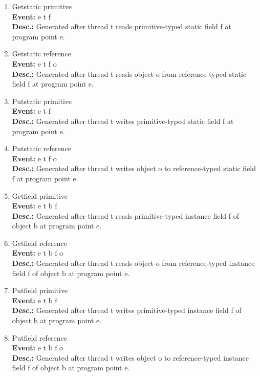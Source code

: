 \begin{enumerate}
\item
Getstatic primitive \\
{\bf Event:}  e t f \\
{\bf Desc.:} Generated after thread t reads primitive-typed static field f at program point e.

\item
Getstatic reference \\
{\bf Event:}  e t f o \\
{\bf Desc.:} Generated after thread t reads object o from reference-typed static field f at program point e.

\item
Putstatic primitive \\
{\bf Event:}  e t f \\
{\bf Desc.:} Generated after thread t writes primitive-typed static field f at program point e.

\item
Putstatic reference \\
{\bf Event:}  e t f o \\
{\bf Desc.:} Generated after thread t writes object o to reference-typed static field f at program point e.

\item
Getfield primitive \\
{\bf Event:}  e t b f \\
{\bf Desc.:} Generated after thread t reads primitive-typed instance field f of object b at program point e.

\item
Getfield reference \\
{\bf Event:}  e t b f o \\
{\bf Desc.:} Generated after thread t reads object o from reference-typed instance field f of object b at program point e.

\item
Putfield primitive \\
{\bf Event:}  e t b f \\
{\bf Desc.:} Generated after thread t writes primitive-typed instance field f of object b at program point e.

\item
Putfield reference \\
{\bf Event:}  e t b f o \\
{\bf Desc.:} Generated after thread t writes object o to reference-typed instance field f of object b at program point e.


\end{enumerate}
